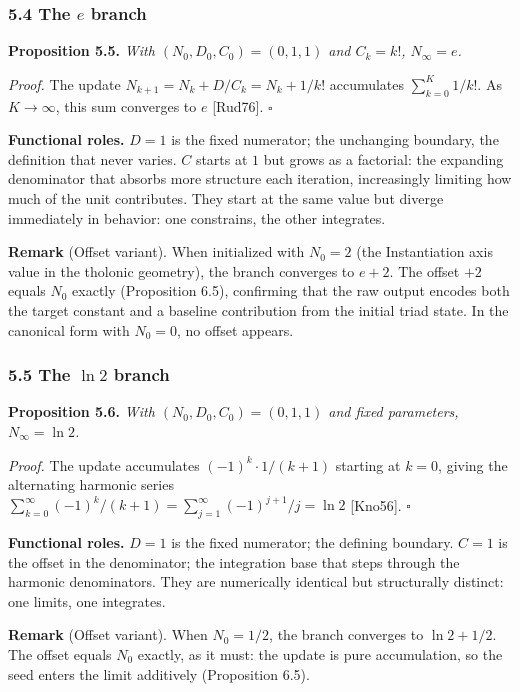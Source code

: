 \documentclass[12pt]{article}
\begin{document}
\subsubsection{\texorpdfstring{5.4 The \(e\)
branch}{5.4 The e branch}}\label{the-e-branch}

\textbf{Proposition 5.5.} \emph{With \((N_0, D_0, C_0) = (0, 1, 1)\) and
\(C_k = k!\), \(N_\infty = e\).}

\emph{Proof.} The update \(N_{k+1} = N_k + D/C_k = N_k + 1/k!\)
accumulates \(\sum_{k=0}^{K} 1/k!\). As \(K \to \infty\), this sum
converges to \(e\) {[}Rud76{]}. \(\square\)

\textbf{Functional roles.} \(D = 1\) is the fixed numerator; the
unchanging boundary, the definition that never varies. \(C\) starts at
\(1\) but grows as a factorial: the expanding denominator that absorbs
more structure each iteration, increasingly limiting how much of the
unit contributes. They start at the same value but diverge immediately
in behavior: one constrains, the other integrates.

\textbf{Remark} (Offset variant). When initialized with \(N_0 = 2\) (the
Instantiation axis value in the tholonic geometry), the branch converges
to \(e + 2\). The offset \(+2\) equals \(N_0\) exactly (Proposition
6.5), confirming that the raw output encodes both the target constant
and a baseline contribution from the initial triad state. In the
canonical form with \(N_0 = 0\), no offset appears.

\subsubsection{\texorpdfstring{5.5 The \(\ln 2\)
branch}{5.5 The \textbackslash ln 2 branch}}\label{the-ln-2-branch}

\textbf{Proposition 5.6.} \emph{With \((N_0, D_0, C_0) = (0, 1, 1)\) and
fixed parameters, \(N_\infty = \ln 2\).}

\emph{Proof.} The update accumulates \((-1)^k \cdot 1/(k+1)\) starting
at \(k = 0\), giving the alternating harmonic series
\(\sum_{k=0}^\infty (-1)^k/(k+1) = \sum_{j=1}^\infty (-1)^{j+1}/j = \ln 2\)
{[}Kno56{]}. \(\square\)

\textbf{Functional roles.} \(D = 1\) is the fixed numerator; the
defining boundary. \(C = 1\) is the offset in the denominator; the
integration base that steps through the harmonic denominators. They are
numerically identical but structurally distinct: one limits, one
integrates.

\textbf{Remark} (Offset variant). When \(N_0 = 1/2\), the branch
converges to \(\ln 2 + 1/2\). The offset equals \(N_0\) exactly, as it
must: the update is pure accumulation, so the seed enters the limit
additively (Proposition 6.5).
\end{document}
